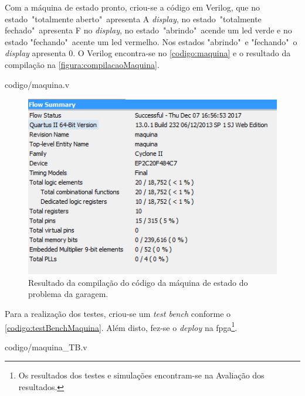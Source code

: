 		Com a máquina de estado pronto, criou-se a código em Verilog, que no
		estado\ "totalmente aberto"\ apresenta A \textit{display}, no estado\ "totalmente fechado"\
		apresenta F no \textit{display}, no estado\ "abrindo"\ acende um \ac{led} verde e no
		estado "fechando"\ acente um \ac{led} vermelho. Nos estados "abrindo"\ e "fechando"\ o
		\textit{display} apresenta 0. O Verilog encontra-se no \autoref{codigo:maquina} e o resultado da
		compilação na \autoref{figura:compilacaoMaquina}.

		
		{codigo/maquina.v}

		\begin{figure}[H]
			 \centering
			 \caption{\label{figura:compilacaoMaquina}Resultado da compilação do código da máquina de
			  estado do problema da garagem.}
			 \includegraphics[width=1\textwidth]{img/maquina/compilacao}
		\end{figure}

		Para a realização dos testes, criou-se um \textit{test bench} conforme o \autoref{codigo:testBenchMaquina}.
		Além disto, fez-se o \textit{deploy} na \ac{fpga}\footnote{Os resultados dos
		 testes e simulações encontram-se na Avaliação dos resultados.}.

		
		{codigo/maquina_TB.v}





